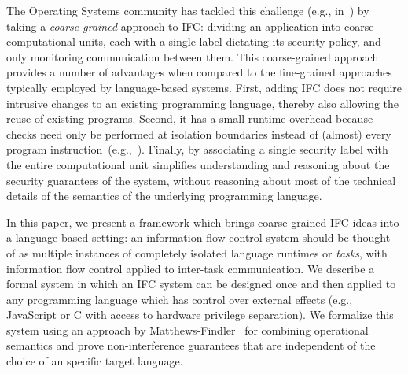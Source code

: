 The Operating Systems community has tackled this challenge (e.g.,
in~\cite{Zeldovich:2006}) by taking a \textit{coarse-grained} approach
to IFC: dividing an application into coarse computational units,
each with a single label dictating its security policy, and only
monitoring communication between them.
This coarse-grained approach provides a number of advantages when
compared to the fine-grained approaches typically employed by language-based systems.
First, adding IFC does not require intrusive changes to an
existing programming language, thereby also allowing
the reuse of existing programs.  Second, it has a small
runtime overhead because checks need only
be performed at isolation boundaries
instead of (almost) every program instruction~(e.g.,~\cite{JSFlow}).
Finally, by associating
a single security label with the entire computational unit simplifies
understanding and reasoning about the security guarantees of the
system, without reasoning about most of the
technical details of the semantics of the underlying programming language.

In this paper, we present a framework which brings coarse-grained IFC
ideas into a language-based setting:
an information flow control system should
be thought of as multiple instances of completely isolated language
runtimes or \emph{tasks}, with information flow control applied to
inter-task communication.  We describe a formal system in which an IFC
system can be designed once and then applied to any programming language
which has control over external effects (e.g., JavaScript or C with
access to hardware privilege separation).  We formalize this system
using an approach by
Matthews-Findler~\cite{Matthews:2007:OSM:1190216.1190220} for combining
operational semantics and prove non-interference guarantees
that are independent of the choice of an specific target language.


